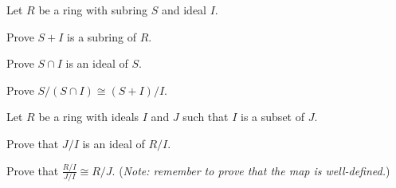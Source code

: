 \begin{problem}\label{problem-ring-isomorphism-2}
    Let $R$ be a ring with subring $S$ and ideal $I$.
    \begin{partquestions}{\roman*}
        \item Prove $S+I$ is a subring of $R$.
        \item Prove $S \cap I$ is an ideal of $S$.
        \item Prove $S/(S\cap I)\cong (S+I)/I$.
    \end{partquestions}
\end{problem}

\begin{problem}\label{problem-ring-isomorphism-3}
    Let $R$ be a ring with ideals $I$ and $J$ such that $I$ is a subset of $J$.
    \begin{partquestions}{\roman*}
        \item Prove that $J/I$ is an ideal of $R/I$.
        \item Prove that $\frac{R/I}{J/I} \cong R/J$.\newline
        (\textit{Note: remember to prove that the map is well-defined.})
    \end{partquestions}
\end{problem}
